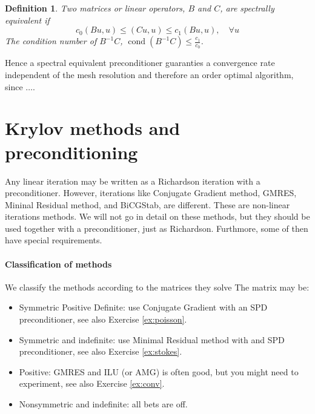 \documentclass[a4paper,11pt]{amsart}
\newcommand\cond{\operatorname{cond}}
\newtheorem{definition}{Definition}[section]
\begin{document}
\begin{definition}
Two matrices or linear operators, $B$ and $C$, are spectrally equivalent if
\[
c_0 (B u, u) \le (C u, u) \le c_1 (B u, u), \quad \forall u
\]
The condition number of $B^{-1} C$, $\cond ( B^{-1} C) \le  \frac{c_1}{c_0} $.
\end{definition}


Hence a spectral equivalent preconditioner guaranties a convergence rate
independent of the mesh resolution and therefore an order optimal algorithm, since $\ldots$.




\section{Krylov methods and preconditioning}

Any linear iteration may be written as a Richardson iteration with a preconditioner.
However, iterations like Conjugate Gradient method, GMRES, Mininal Residual method, and
BiCGStab, are different. These are non-linear iterations methods. We will not 
go in detail on these methods, but they should be used together with a
preconditioner, just as Richardson. Furthmore, some of then have special requirements.   

\paragraph{Classification of methods}
We classify the methods according to the matrices they solve
The matrix may be:
\begin{itemize}
\item Symmetric Positive Definite: use Conjugate Gradient with an SPD preconditioner, see also Exercise \ref{ex:poisson}. 
\item Symmetric and indefinite: use Minimal Residual method with and SPD preconditioner, see also Exercise \ref{ex:stokes}.  
\item Positive: GMRES and ILU (or AMG) is often good, but you might need to experiment, see also Exercise \ref{ex:conv}. 
\item Nonsymmetric and indefinite: all bets are off. 
\end{itemize}



\end{document}
